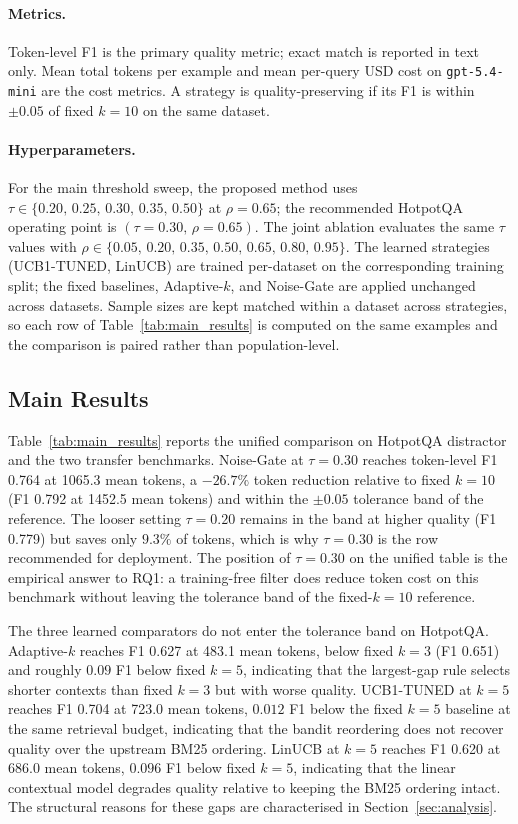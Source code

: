 \documentclass[runningheads]{llncs}
\begin{document}
\paragraph{Metrics.} Token-level F1 is the primary quality metric; exact match is reported in text only. Mean total tokens per example and mean per-query USD cost on \texttt{gpt-5.4-mini} are the cost metrics. A strategy is quality-preserving if its F1 is within $\pm 0.05$ of fixed $k{=}10$ on the same dataset.

\paragraph{Hyperparameters.} For the main threshold sweep, the proposed method uses $\tau\in\{0.20,\,0.25,\,0.30,\,0.35,\,0.50\}$ at $\rho{=}0.65$; the recommended HotpotQA operating point is $(\tau{=}0.30,\,\rho{=}0.65)$. The joint ablation evaluates the same $\tau$ values with $\rho\in\{0.05,\,0.20,\,0.35,\,0.50,\,0.65,\,0.80,\,0.95\}$. The learned strategies (UCB1-TUNED, LinUCB) are trained per-dataset on the corresponding training split; the fixed baselines, Adaptive-$k$, and Noise-Gate are applied unchanged across datasets. Sample sizes are kept matched within a dataset across strategies, so each row of Table~\ref{tab:main_results} is computed on the same examples and the comparison is paired rather than population-level.

\subsection{Main Results}
\label{subsec:main_results}

Table~\ref{tab:main_results} reports the unified comparison on HotpotQA distractor and the two transfer benchmarks. Noise-Gate at $\tau{=}0.30$ reaches token-level F1 0.764 at 1065.3 mean tokens, a $-26.7\%$ token reduction relative to fixed $k{=}10$ (F1 0.792 at 1452.5 mean tokens) and within the $\pm 0.05$ tolerance band of the reference. The looser setting $\tau{=}0.20$ remains in the band at higher quality (F1 0.779) but saves only $9.3\%$ of tokens, which is why $\tau{=}0.30$ is the row recommended for deployment. The position of $\tau{=}0.30$ on the unified table is the empirical answer to RQ1: a training-free filter does reduce token cost on this benchmark without leaving the tolerance band of the fixed-$k{=}10$ reference.

The three learned comparators do not enter the tolerance band on HotpotQA. Adaptive-$k$ reaches F1 0.627 at 483.1 mean tokens, below fixed $k{=}3$ (F1 0.651) and roughly $0.09$ F1 below fixed $k{=}5$, indicating that the largest-gap rule selects shorter contexts than fixed $k{=}3$ but with worse quality. UCB1-TUNED at $k{=}5$ reaches F1 0.704 at 723.0 mean tokens, $0.012$ F1 below the fixed $k{=}5$ baseline at the same retrieval budget, indicating that the bandit reordering does not recover quality over the upstream BM25 ordering. LinUCB at $k{=}5$ reaches F1 0.620 at 686.0 mean tokens, $0.096$ F1 below fixed $k{=}5$, indicating that the linear contextual model degrades quality relative to keeping the BM25 ordering intact. The structural reasons for these gaps are characterised in Section~\ref{sec:analysis}.
\end{document}

